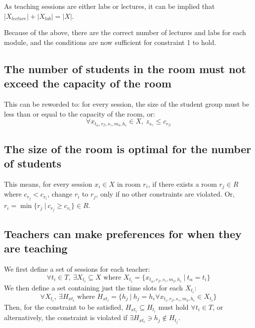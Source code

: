 As teaching sessions are either labs or lectures, it can be implied that \( 
\lvert X_{lecture} \rvert + \lvert X_{lab} \rvert = \lvert X \rvert \).

Because of the above, there are the correct number of lectures and labs for 
each module, and the conditions are now sufficient for constraint 1 to hold. 

\subsection{The number of students in the room must not exceed the capacity of 
	the room}

This can be reworded to: for every session, the size of the student group must 
be less than or equal to the capacity of the room, or:
\begin{equation*}
	\forall x_{t_{\alpha},r_{\beta},s_{\gamma},m_{\delta},h_{\epsilon}} \in X, 
	\: z_{s_{\gamma}} \leq c_{r_{\beta}}
\end{equation*}

\subsection{The size of the room is optimal for the number of students}

This means, for every session \( x_i \in X \) in room \( r_i \), if there 
exists a room \( r_j \in R \) where \( c_{r_j} < c_{r_i} \), change \( 
r_i \) to \( r_j \), only if no other constraints are violated. Or, \( r_i = 
\min \{ r_j \: | \: c_{r_j} \geq c_{r_i} \} \in R \).

\subsection{Teachers can make preferences for when they are teaching}

We first define a set of sessions for each teacher:
\begin{equation*}
	\forall t_i \in T, \: \exists X_{t_i} \subseteq X \text{ where } X_{t_i} = 
	\{ x_{t_{\alpha},r_{\beta},s_{\gamma},m_{\delta},h_{\epsilon}} \: | \: 
	t_{\alpha} = t_i\}
\end{equation*}
We then define a set containing just the time slots for each \( X_{t_i} \):
\begin{equation*}
	\forall X_{t_i}, \: \exists H_{xt_i} \text{ where } H_{xt_i} = \{ h_j \: | 
	\: h_j = h_{\epsilon} \forall x_{t_i,r_{\beta},s_{\gamma},m_{\delta},
	h_{\epsilon}} \in X_{t_i}\}
\end{equation*}
Then, for the constraint to be satisfied, \( H_{xt_i} \subseteq H_{t_i} \) must
hold \( \forall t_i \in T \), or alternatively, the constraint is violated if
\( \exists H_{xt_i} \ni h_j \notin H_{t_j} \).

